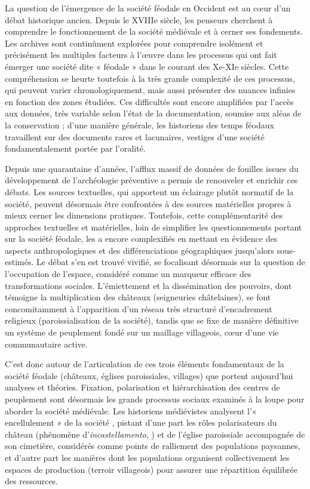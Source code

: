 {\redroman
	La question de l'émergence de la société féodale en Occident est au cœur d'un débat historique ancien.
	Depuis le XVIIIe siècle, les penseurs cherchent à comprendre le fonctionnement de la société médiévale et à cerner ses fondements.
	Les archives sont continûment explorées pour comprendre isolément et précisément les multiples facteurs à l'œuvre dans les processus qui ont fait émerger une société dite « féodale » dans le courant des Xe-XIe siècles.
	Cette compréhension se heurte toutefois à la très grande complexité de ces processus, qui peuvent varier chronologiquement, mais aussi présenter des nuances infinies en fonction des zones étudiées.
	Ces difficultés sont encore amplifiées par l'accès aux données, très variable selon l'état de la documentation, soumise aux aléas de la conservation ; d'une manière générale, les historiens des temps féodaux travaillent sur des documents rares et lacunaires, vestiges d'une société fondamentalement portée par l'oralité.
	
	Depuis une quarantaine d'années, l'afflux massif de données de fouilles issues du développement de l'archéologie préventive a permis de renouveler et enrichir ces débats.
	Les sources textuelles, qui apportent un éclairage plutôt normatif de la société, peuvent désormais être confrontées à des sources matérielles propres à mieux cerner les dimensions pratiques.
	Toutefois, cette complémentarité des approches textuelles et matérielles, loin de simplifier les questionnements portant sur la société féodale, les a encore complexifiés en mettant en évidence des aspects anthropologiques et des différenciations géographiques jusqu'alors sous-estimés.
	Le débat s'en est trouvé vivifié, se focalisant désormais sur la question de l'occupation de l'espace, considéré comme un marqueur efficace des transformations sociales.
	L'émiettement et la dissémination des pouvoirs, dont témoigne la multiplication des châteaux (seigneuries châtelaines), se font concomitamment à l'apparition d'un réseau très structuré d'encadrement religieux (paroissialisation de la société), tandis que se fixe de manière définitive un système de peuplement fondé sur un maillage villageois, cœur d'une vie communautaire active.
	
	C'est donc autour de l'articulation de ces trois éléments fondamentaux de la société féodale (châteaux, églises paroissiales, villages) que portent aujourd'hui analyses et théories.
	Fixation, polarisation et hiérarchisation des centres de peuplement sont désormais les grands processus sociaux examinés à la loupe pour aborder la société médiévale.
	Les historiens médiévistes analysent l'« encellulement » de la société \autocite{fossier_enfance_1982}, pistant d'une part les rôles polarisateurs du château (phénomène d'\textit{incastellamento},  \cite{toubert_les_1973}) et de l'église paroissiale accompagnée de son cimetière, considérés comme points de ralliement des populations paysannes, et d'autre part les manières dont les populations organisent collectivement les espaces de production (terroir villageois) pour assurer une répartition équilibrée des ressources.
	
}
